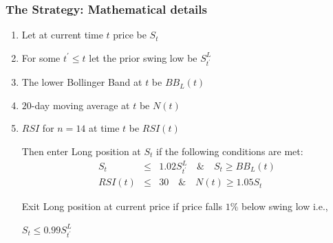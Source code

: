 \documentclass[slidestop,compress,mathserif,9pt]{beamer}
\def\be{\begin{enumerate}}
\def\ee{\end{enumerate}}
\begin{document}
\begin{frame}

\frametitle{The Strategy: Mathematical details}

\be

\item
Let at current time $t$ price be $S_t$ 
\item For some $t^{\prime} \le t$ let the prior swing low be $S_{t^{\prime}}^L$ 
\item The lower Bollinger Band at $t$ be $BB_L(t)$
\item $20$-day moving average at $t$ be $N(t)$
\item $RSI$ for $n=14$ at time $t$ be $RSI(t)$

Then enter Long position at $S_t$ if the following conditions are met:
\begin{eqnarray}
S_t &\le& 1.02S_{t^{\prime}}^L\quad \& \quad S_t \ge BB_L(t)\\
RSI(t) &\le& 30 \quad \& \quad N(t) \ge 1.05 S_t
\end{eqnarray}
 
Exit Long position at current price if price falls $1\%$ below swing low i.e.,
\begin{center}
$S_t \le 0.99S_{t^{\prime}}^L$
\end{center}


\ee







\end{frame}
\end{document}
